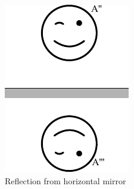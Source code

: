 \begin{figure}[h]
	\centerline{\includegraphics[scale=1.1]{2016-v3g-08-nurgapeegel_j3}}
	\caption{Reflection from horizontal mirror}
\end{figure}
\probend